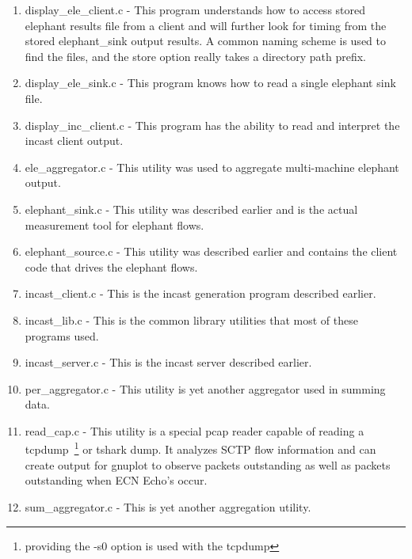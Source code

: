 \documentclass[12pt]{article}
\begin{document}
\begin{enumerate}

\item display\_ele\_client.c - This program understands how to access stored elephant results file from a
client and will further look for timing from the stored elephant\_sink output results. A common naming
scheme is used to find the files, and the store option really takes a directory path prefix. 

\item display\_ele\_sink.c - This program knows how to read a single elephant sink file.

\item display\_inc\_client.c - This program has the ability to read and interpret the incast client output.

\item ele\_aggregator.c - This utility was used to aggregate multi-machine elephant output.

\item elephant\_sink.c - This utility was described earlier and is the actual measurement tool for elephant flows.

\item elephant\_source.c - This utility was described earlier and contains the client code that drives the elephant
flows.

\item incast\_client.c - This is the incast generation program described earlier.

\item incast\_lib.c - This is the common library utilities that most of these programs used.

\item incast\_server.c - This is the incast server described earlier.

\item per\_aggregator.c - This utility is yet another aggregator used in summing data.

\item read\_cap.c - This utility is a special pcap reader capable of reading a tcpdump~\footnote{providing the -s0 option
is used with the tcpdump} or tshark dump. It analyzes SCTP flow information and can create output for gnuplot
to observe packets outstanding as well as packets outstanding when ECN Echo's occur.

\item sum\_aggregator.c - This is yet another aggregation utility.

\end{enumerate}
\end{document}

